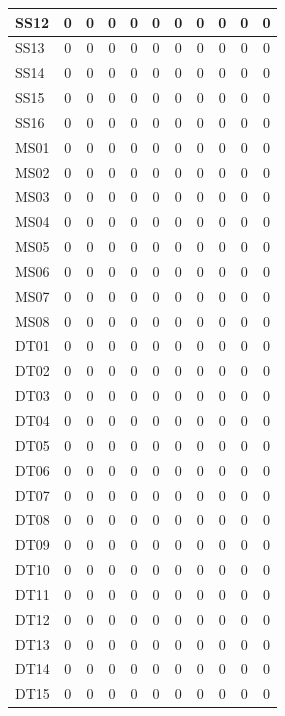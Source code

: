 \documentclass [10pt]{article}
\begin{document}
\begin{longtable}{ | p{}  | c | c | c | c | c | c | c | c | c | c | }
	SS12 & 0 & 0 & 0 & 0 & 0 & 0 & 0 & 0 & 0 & 0 \\ \hline
	SS13 & 0 & 0 & 0 & 0 & 0 & 0 & 0 & 0 & 0 & 0 \\ \hline
	SS14 & 0 & 0 & 0 & 0 & 0 & 0 & 0 & 0 & 0 & 0 \\ \hline
	SS15 & 0 & 0 & 0 & 0 & 0 & 0 & 0 & 0 & 0 & 0 \\ \hline
	SS16 & 0 & 0 & 0 & 0 & 0 & 0 & 0 & 0 & 0 & 0 \\ \hline
	MS01 & 0 & 0 & 0 & 0 & 0 & 0 & 0 & 0 & 0 & 0 \\ \hline
	MS02 & 0 & 0 & 0 & 0 & 0 & 0 & 0 & 0 & 0 & 0 \\ \hline
	MS03 & 0 & 0 & 0 & 0 & 0 & 0 & 0 & 0 & 0 & 0 \\ \hline
	MS04 & 0 & 0 & 0 & 0 & 0 & 0 & 0 & 0 & 0 & 0 \\ \hline
	MS05 & 0 & 0 & 0 & 0 & 0 & 0 & 0 & 0 & 0 & 0 \\ \hline
	MS06 & 0 & 0 & 0 & 0 & 0 & 0 & 0 & 0 & 0 & 0 \\ \hline
	MS07 & 0 & 0 & 0 & 0 & 0 & 0 & 0 & 0 & 0 & 0 \\ \hline
	MS08 & 0 & 0 & 0 & 0 & 0 & 0 & 0 & 0 & 0 & 0 \\ \hline
	DT01 & 0 & 0 & 0 & 0 & 0 & 0 & 0 & 0 & 0 & 0 \\ \hline
	DT02 & 0 & 0 & 0 & 0 & 0 & 0 & 0 & 0 & 0 & 0 \\ \hline
	DT03 & 0 & 0 & 0 & 0 & 0 & 0 & 0 & 0 & 0 & 0 \\ \hline
	DT04 & 0 & 0 & 0 & 0 & 0 & 0 & 0 & 0 & 0 & 0 \\ \hline
	DT05 & 0 & 0 & 0 & 0 & 0 & 0 & 0 & 0 & 0 & 0 \\ \hline
	DT06 & 0 & 0 & 0 & 0 & 0 & 0 & 0 & 0 & 0 & 0 \\ \hline
	DT07 & 0 & 0 & 0 & 0 & 0 & 0 & 0 & 0 & 0 & 0 \\ \hline
	DT08 & 0 & 0 & 0 & 0 & 0 & 0 & 0 & 0 & 0 & 0 \\ \hline
	DT09 & 0 & 0 & 0 & 0 & 0 & 0 & 0 & 0 & 0 & 0 \\ \hline
	DT10 & 0 & 0 & 0 & 0 & 0 & 0 & 0 & 0 & 0 & 0 \\ \hline
	DT11 & 0 & 0 & 0 & 0 & 0 & 0 & 0 & 0 & 0 & 0 \\ \hline
	DT12 & 0 & 0 & 0 & 0 & 0 & 0 & 0 & 0 & 0 & 0 \\ \hline
	DT13 & 0 & 0 & 0 & 0 & 0 & 0 & 0 & 0 & 0 & 0 \\ \hline
	DT14 & 0 & 0 & 0 & 0 & 0 & 0 & 0 & 0 & 0 & 0 \\ \hline
	DT15 & 0 & 0 & 0 & 0 & 0 & 0 & 0 & 0 & 0 & 0 \\ \hline

\end{longtable}
\end{document}
